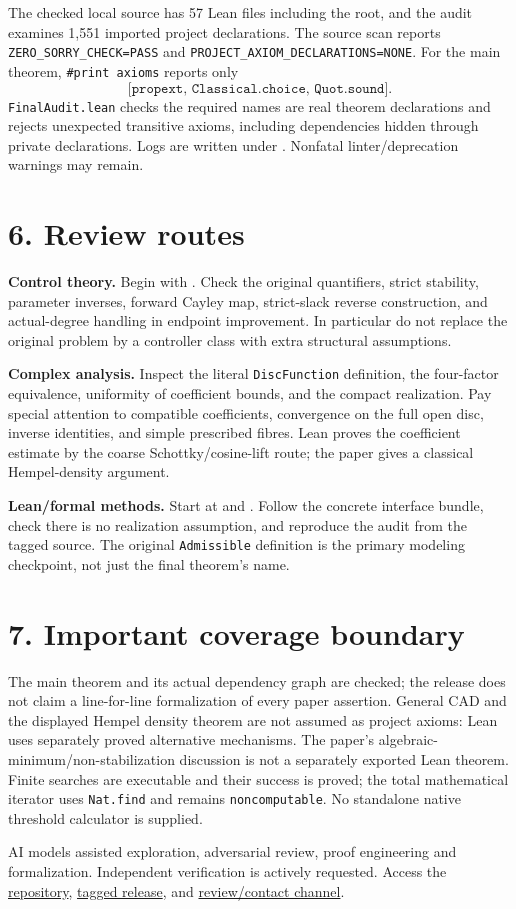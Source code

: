 \documentclass[10pt,a4paper]{article}
\newcommand{\repo}{https://github.com/chengxuandi/belgian-chocolate-problem-lean-proof-20260910210030-init}
\begin{document}
The checked local source has 57 Lean files including the root, and the audit
examines 1,551 imported project declarations. The source scan reports
\texttt{ZERO\_SORRY\_CHECK=PASS} and
\texttt{PROJECT\_AXIOM\_DECLARATIONS=NONE}. For the main theorem,
\texttt{\#print axioms} reports only
\[
\texttt{[propext, Classical.choice, Quot.sound]}.
\]
\texttt{FinalAudit.lean} checks the required names are real theorem declarations
and rejects unexpected transitive axioms, including dependencies hidden through
private declarations. Logs are written under .
Nonfatal linter/deprecation warnings may remain.

\section*{6. Review routes}
\textbf{Control theory.} Begin with .
Check the original quantifiers, strict stability, parameter inverses,
forward Cayley map, strict-slack reverse construction, and actual-degree
handling in endpoint improvement. In particular do not replace the original
problem by a controller class with extra structural assumptions.

\textbf{Complex analysis.} Inspect the literal \texttt{DiscFunction} definition,
the four-factor equivalence, uniformity of coefficient bounds, and the
compact realization. Pay special attention to compatible coefficients,
convergence on the full open disc, inverse identities, and simple prescribed
fibres. Lean proves the coefficient estimate by the coarse Schottky/cosine-lift
route; the paper gives a classical Hempel-density argument.

\textbf{Lean/formal methods.} Start at  and
. Follow the concrete interface bundle,
check there is no realization assumption, and reproduce the audit from the
tagged source. The original \texttt{Admissible} definition is the primary
modeling checkpoint, not just the final theorem's name.

\section*{7. Important coverage boundary}
The main theorem and its actual dependency graph are checked; the release
does not claim a line-for-line formalization of every paper assertion.
General CAD and the displayed Hempel density theorem are not assumed as
project axioms: Lean uses separately proved alternative mechanisms.
The paper's algebraic-minimum/non-stabilization discussion is not a separately
exported Lean theorem. Finite searches are executable and their success is proved;
the total mathematical iterator uses \texttt{Nat.find} and remains
\texttt{noncomputable}. No standalone native threshold calculator is supplied.

AI models assisted exploration, adversarial review, proof engineering and
formalization. Independent verification is actively requested. Access the
\href{\repo}{repository},
\href{\repo/releases/tag/v1.0.0-proof-candidate}{tagged release}, and
\href{\repo/issues}{review/contact channel}.
\end{document}
